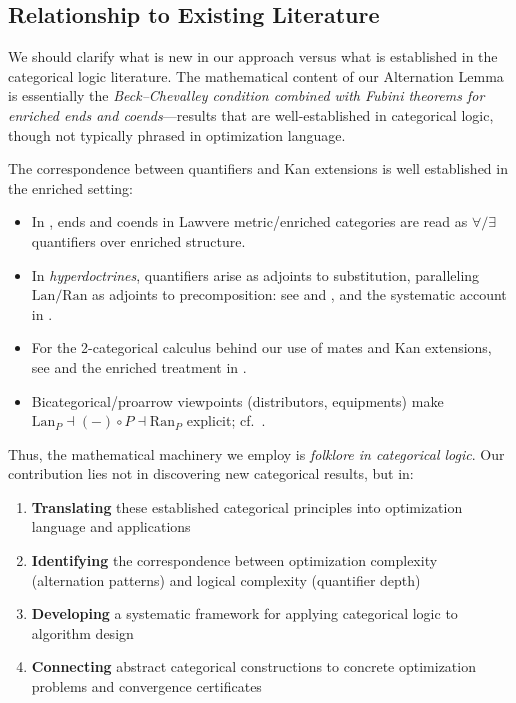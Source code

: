\documentclass[11pt]{article}
\numberwithin{equation}{section}
\theoremstyle{upright}
\newcommand{\Lan}{\mathrm{Lan}}
\newcommand{\Ran}{\mathrm{Ran}}
\begin{document}
\subsection{Relationship to Existing Literature}

We should clarify what is new in our approach versus what is established in the categorical logic literature. The mathematical content of our Alternation Lemma is essentially the \emph{Beck--Chevalley condition combined with Fubini theorems for enriched ends and coends}—results that are well-established in categorical logic, though not typically phrased in optimization language.

The correspondence between quantifiers and Kan extensions is well established in the enriched setting:
\begin{itemize}[itemsep=0.5ex]
\item In \citet{Lawvere1973}, ends and coends in Lawvere metric/enriched categories are read as
      $\forall/\exists$ quantifiers over enriched structure.
\item In \emph{hyperdoctrines}, quantifiers arise as adjoints to substitution, paralleling
      $\Lan/\Ran$ as adjoints to precomposition: see \citet{Lawvere1969} and
      \citet{Seely1983}, and the systematic account in \citet{Jacobs1999}.
\item For the 2-categorical calculus behind our use of mates and Kan extensions, see
      \citet{StreetWalters1978} and the enriched treatment in \citet{Kelly1982}.
\item Bicategorical/proarrow viewpoints (distributors, equipments) make
      $\Lan_P \dashv (-)\circ P \dashv \Ran_P$ explicit; cf.\ \citet{Benabou1967,Wood1990,Shulman2008}.
\end{itemize}


Thus, the mathematical machinery we employ is \emph{folklore in categorical logic}. Our contribution lies not in discovering new categorical results, but in:
\begin{enumerate}[itemsep=0.5ex]
\item \textbf{Translating} these established categorical principles into optimization language and applications
\item \textbf{Identifying} the correspondence between optimization complexity (alternation patterns) and logical complexity (quantifier depth)  
\item \textbf{Developing} a systematic framework for applying categorical logic to algorithm design
\item \textbf{Connecting} abstract categorical constructions to concrete optimization problems and convergence certificates
\end{enumerate}
\end{document}
